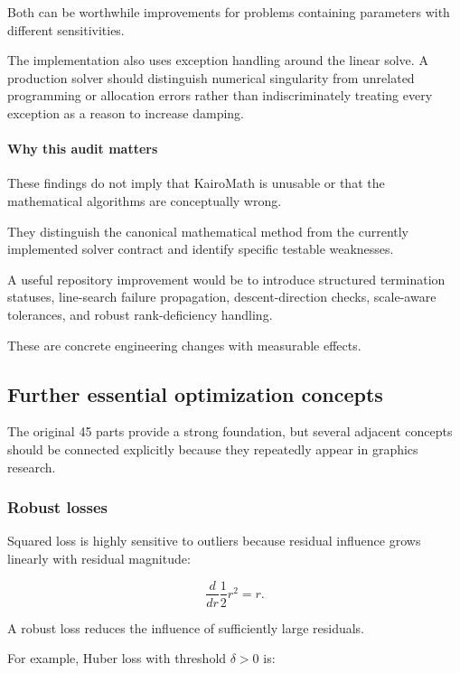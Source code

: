 Both can be worthwhile improvements for problems containing parameters with different sensitivities.

The implementation also uses exception handling around the linear solve. A production solver should distinguish numerical singularity from unrelated programming or allocation errors rather than indiscriminately treating every exception as a reason to increase damping.

\paragraph{Why this audit matters}\label{02-foundations-ii-ch028-why-this-audit-matters}

These findings do not imply that KairoMath is unusable or that the mathematical algorithms are conceptually wrong.

They distinguish the canonical mathematical method from the currently implemented solver contract and identify specific testable weaknesses.

A useful repository improvement would be to introduce structured termination statuses, line-search failure propagation, descent-direction checks, scale-aware tolerances, and robust rank-deficiency handling.

These are concrete engineering changes with measurable effects.

\subsection{Further essential optimization concepts}\label{02-foundations-ii-ch028-further-essential-optimization-concepts}

The original 45 parts provide a strong foundation, but several adjacent concepts should be connected explicitly because they repeatedly appear in graphics research.

\subsubsection{Robust losses}\label{02-foundations-ii-ch028-robust-losses}

Squared loss is highly sensitive to outliers because residual influence grows linearly with residual magnitude:

\[
\frac d{dr}\frac12r^2=r.
\]

A robust loss reduces the influence of sufficiently large residuals.

For example, Huber loss with threshold \(\delta>0\) is:

